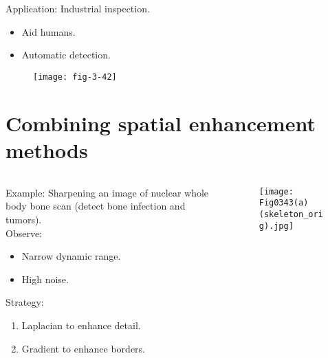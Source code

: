 \begin{frame}
Application: Industrial inspection.
\begin{itemize}
\item Aid humans.
\item Automatic detection.
\end{itemize}
\begin{figure}
\centering
\texttt{[image: fig-3-42]}
\end{figure}
\end{frame}


\section{Combining spatial enhancement methods}


\begin{frame}
\begin{columns}
\begin{column}{.5\textwidth}
Example: Sharpening an image of nuclear whole body bone scan (detect bone infection and tumors).\\
Observe:
\begin{itemize}
\item Narrow dynamic range.
\item High noise.
\end{itemize}
Strategy:
\begin{enumerate}
\item Laplacian to enhance detail.
\item Gradient to enhance borders.
\end{enumerate}
\end{column}
\begin{column}{.5\textwidth}
\begin{figure}
\centering
\texttt{[image: Fig0343(a)(skeleton\_orig).jpg]}
\end{figure}
\end{column}
\end{columns}
\end{frame}


